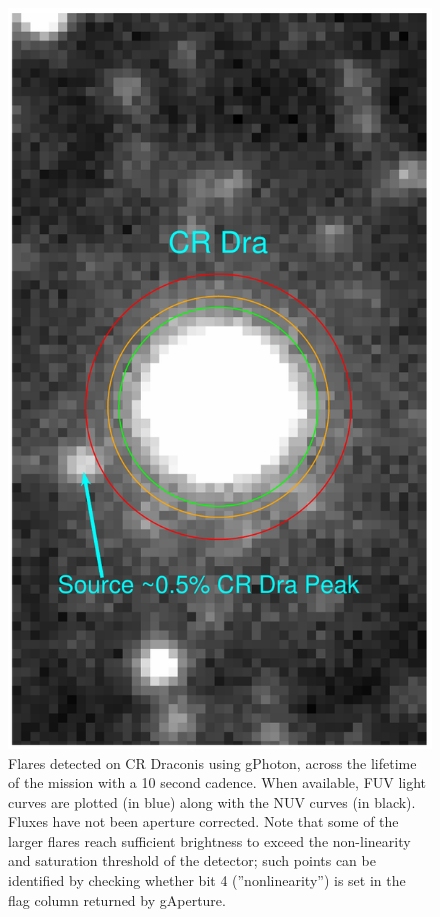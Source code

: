 \documentclass[preprint]{aastex}
\begin{document}
\clearpage
\begin{figure}[h]
\includegraphics[scale=0.375]{Fig12.pdf}
\caption{Flares detected on CR Draconis using gPhoton, across the lifetime of the mission with a 10 second cadence. When available, FUV light curves are plotted (in blue) along with the NUV curves (in black). Fluxes have not been aperture corrected. Note that some of the larger flares reach sufficient brightness to exceed the non-linearity and saturation threshold of the detector; such points can be identified by checking whether bit 4 (''nonlinearity'') is set in the flag column returned by gAperture.
\label{crdraflares}}
\end{figure}
\clearpage
\end{document}
